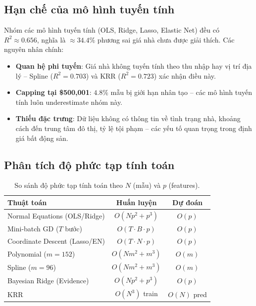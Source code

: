 \documentclass[12pt, a4paper]{article}
\begin{document}
\subsection{Hạn chế của mô hình tuyến tính}

Nhóm các mô hình tuyến tính (OLS, Ridge, Lasso, Elastic Net) đều có
$R^2 \approx 0.656$, nghĩa là $\approx 34.4\%$ phương sai giá nhà
chưa được giải thích. Các nguyên nhân chính:
\begin{itemize}
  \item \textbf{Quan hệ phi tuyến}: Giá nhà không tuyến tính theo
        thu nhập hay vị trí địa lý -- Spline ($R^2 = 0.703$) và KRR
        ($R^2 = 0.723$) xác nhận điều này.
  \item \textbf{Capping tại \$500{,}001}: $4.8\%$ mẫu bị giới hạn
        nhân tạo -- các mô hình tuyến tính luôn underestimate nhóm này.
  \item \textbf{Thiếu đặc trưng}: Dữ liệu không có thông tin về
        tình trạng nhà, khoảng cách đến trung tâm đô thị, tỷ lệ tội
        phạm -- các yếu tố quan trọng trong định giá bất động sản.
\end{itemize}

\subsection{Phân tích độ phức tạp tính toán}

\begin{table}[H]
  \centering
  \caption{So sánh độ phức tạp tính toán theo $N$ (mẫu) và $p$ (features).}
  \label{tab:complexity_final}
  \begin{tabular}{lcc}
    \toprule
    \textbf{Thuật toán} & \textbf{Huấn luyện} & \textbf{Dự đoán} \\
    \midrule
    Normal Equations (OLS/Ridge) & $O(Np^2 + p^3)$       & $O(p)$      \\
    Mini-batch GD ($T$ bước)     & $O(T \cdot B \cdot p)$ & $O(p)$      \\
    Coordinate Descent (Lasso/EN)& $O(T \cdot N \cdot p)$ & $O(p)$      \\
    Polynomial ($m=152$)         & $O(Nm^2 + m^3)$       & $O(m)$      \\
    Spline ($m=96$)              & $O(Nm^2 + m^3)$       & $O(m)$      \\
    Bayesian Ridge (Evidence)    & $O(Np^2 + p^3)$       & $O(p)$      \\
    KRR                          & $O(N^3)$ train        & $O(N)$ pred \\
    \bottomrule
  \end{tabular}
\end{table}
\end{document}
